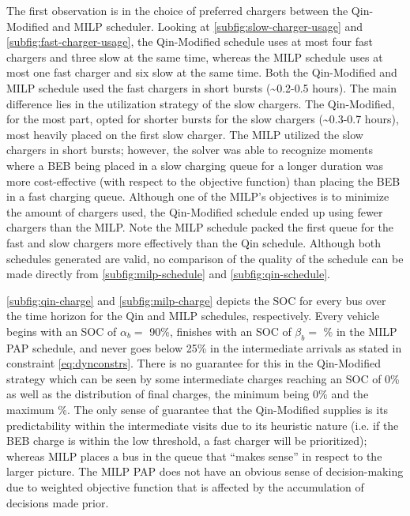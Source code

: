 \documentclass[ee,thesis]{usuthesis}
\newcommand{\bcharge}{0.7 }                                                     %
\newcommand{\mincharge}{25\% }                                                  %
\newcommand{\batsize}{388 }                                                     %
\begin{document}
The first observation is in the choice of preferred chargers between the Qin-Modified and MILP scheduler. Looking at
\autoref{subfig:slow-charger-usage} and \autoref{subfig:fast-charger-usage}, the Qin-Modified schedule uses at most four
fast chargers and three slow at the same time, whereas the MILP schedule uses at most one fast charger and six slow at
the same time. Both the Qin-Modified and MILP schedule used the fast chargers in short bursts (\textasciitilde{}0.2-0.5 hours). The main
difference lies in the utilization strategy of the slow chargers. The Qin-Modified, for the most part, opted for shorter
bursts for the slow chargers (\textasciitilde{}0.3-0.7 hours), most heavily placed on the first slow charger. The MILP
utilized the slow chargers in short bursts; however, the solver was able to recognize moments where a BEB being placed
in a slow charging queue for a longer duration was more cost-effective (with respect to the objective function) than
placing the BEB in a fast charging queue. Although one of the MILP's objectives is to minimize the amount of chargers
used, the Qin-Modified schedule ended up using fewer chargers than the MILP. Note the MILP schedule
packed the first queue for the fast and slow chargers more effectively than the Qin schedule. Although both schedules
generated are valid, no comparison of the quality of the schedule can be made directly from
\autoref{subfig:milp-schedule} and \autoref{subfig:qin-schedule}.

\autoref{subfig:qin-charge} and \autoref{subfig:milp-charge} depicts the SOC for every bus over the time horizon for the
Qin and MILP schedules, respectively. Every vehicle begins with an SOC of \(\alpha_b =\) 90\%, finishes with an SOC of \(\beta_b =\)
\fpeval{\bcharge *100}\% in the MILP PAP schedule, and never goes below \mincharge in the intermediate arrivals as stated
in constraint \autoref{eq:dynconstrs}. There is no guarantee for this in the Qin-Modified strategy which can be seen by
some intermediate charges reaching an SOC of 0\% as well as the distribution of final charges, the minimum being 0\% and
the maximum \fpeval{trunc(\fpeval{368 / \batsize * 100}, 3)}\%. The only sense of guarantee that the
Qin-Modified supplies is its predictability within the intermediate visits due to its heuristic nature (i.e. if the BEB
charge is within the low threshold, a fast charger will be prioritized); whereas MILP places a bus in the queue that
``makes sense'' in respect to the larger picture. The MILP PAP does not have an obvious sense of decision-making due to
weighted objective function that is affected by the accumulation of decisions made prior.
\end{document}
